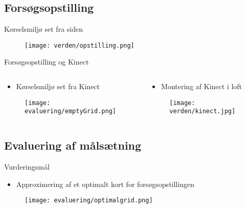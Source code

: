 \subsection{Forsøgsopstilling}
\begin{frame}[fragile]{Kørselsmiljø set fra siden}
	\begin{figure}
		\texttt{[image: verden/opstilling.png]}
	\end{figure}
\end{frame}

\begin{frame}[fragile]{Forsøgsopstilling og Kinect}
	\begin{columns}
		\begin{column}{0.5\textwidth}
			\begin{itemize}
				\item Kørselsmiljø set fra Kinect
			\end{itemize}
			\begin{figure}
				\texttt{[image: evaluering/emptyGrid.png]}
			\end{figure}
		\end{column}
		
		\begin{column}{0.5\textwidth}
				\begin{itemize}
					\item Montering af Kinect i loft
				\end{itemize}
			\begin{figure}
				\texttt{[image: verden/kinect.jpg]}
			\end{figure}
	\end{column}
\end{columns}
\end{frame}

\subsection{Evaluering af målsætning}
\begin{frame}[fragile]{Vurderingsmål}
	\begin{itemize}
		\item Approximering af et optimalt kort for forsøgsopstillingen
	\end{itemize}
	
	\begin{figure}
		\texttt{[image: evaluering/optimalgrid.png]}
	\end{figure}
\end{frame}